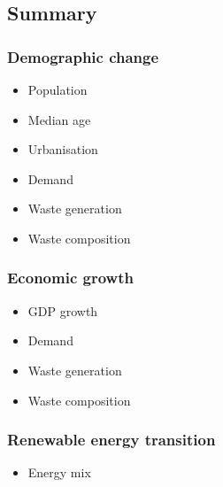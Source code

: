 \clearpage
\subsection{Summary}


\subsubsection{Demographic change}


    \begin{itemize}
        \item Population
        \item Median age
        \item Urbanisation
    \end{itemize}
    
    \begin{itemize}
        \item Demand
        \item Waste generation
        \item Waste composition
    \end{itemize}

\subsubsection{Economic growth}


    \begin{itemize}
        \item GDP growth
    \end{itemize}
    
    \begin{itemize}
        \item Demand
        \item Waste generation
        \item Waste composition
    \end{itemize}

\subsubsection{Renewable energy transition}


    \begin{itemize}
        \item Energy mix
    \end{itemize}
    
